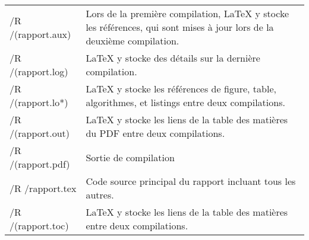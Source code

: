 \begin{onecolumn}
\begin{longtable}{>{\ttfamily}m{} p{}}
    /R /(rapport.aux)          & Lors de la première compilation,
                                 LaTeX y stocke les références, qui
                                 sont mises à jour lors de la deuxième
                                 compilation.\\
    /R /(rapport.log)          & LaTeX y stocke des détails sur la
                                 dernière compilation.\\
    /R /(rapport.lo*)          & LaTeX y stocke les références de
                                 figure, table, algorithmes, et
                                 listings entre deux compilations.\\
    /R /(rapport.out)          & LaTeX y stocke les liens de la table
                                 des matières du PDF entre deux
                                 compilations.\\
    /R /(rapport.pdf)          & Sortie de compilation\\
    /R /rapport.tex            & Code source principal du rapport
                                 incluant tous les autres.\\
    /R /(rapport.toc)          & LaTeX y stocke les liens de la table
                                 des matières entre deux
                                 compilations.\\
\end{longtable}

\end{onecolumn}

\clearpage

\twocolumn

